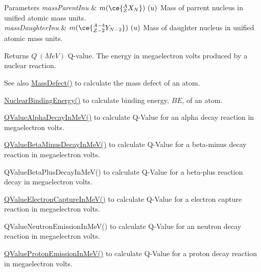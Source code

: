 \begin{DoxyParams}{Parameters}
{\em mass\+Parent\+Inu} & $m(\ce{ ^{A}_{Z}X_{N} })\ (u)$ Mass of parrent nucleus in unified atomic mass units. \\
\hline
{\em mass\+Daughter\+Inu} & $m(\ce{ ^{A-4}_{Z-2}Y_{N-2} })\ (u)$ Mass of daughter nucleus in unified atomic mass units. \\
\hline
\end{DoxyParams}
\begin{DoxyReturn}{Returns}
$Q\ (MeV)$ Q-\/value. The energy in megaelectron volts produced by a nuclear reaction. 
\end{DoxyReturn}
\begin{DoxySeeAlso}{See also}
\mbox{\hyperlink{group___e_g_x_phys-_mass_defect_gae89f2dfa65992c0314adc2440b2f582a}{Mass\+Defect()}} to calculate the mass defect of an atom. 

\mbox{\hyperlink{group___e_g_x_phys-_nuclear_binding_energy_gab6832bf15ead7b4e867e759e0a2a078e}{Nuclear\+Binding\+Energy()}} to calculate binding energy, $BE$, of an atom. 

\mbox{\hyperlink{group___e_g_x_phys-_q_value-_alpha_ga4f9a38d3ad4bf93471a0affb493b6e72}{Q\+Value\+Alpha\+Decay\+In\+Me\+V()}} to calculate Q-\/\+Value for an alpha decay reaction in megaelectron volts. 

\mbox{\hyperlink{group___e_g_x_phys-_q_value-_beta_minus_gaac1374ce9ba39bef416f34298708bda9}{Q\+Value\+Beta\+Minus\+Decay\+In\+Me\+V()}} to calculate Q-\/\+Value for a beta-\/minus decay reaction in megaelectron volts. 

Q\+Value\+Beta\+Plus\+Decay\+In\+Me\+V() to calculate Q-\/\+Value for a beta-\/plus reaction decay in megaelectron volts. 

\mbox{\hyperlink{group___e_g_x_phys-_q_value-_electron_capture_ga9cd8502b6101614c17114e9710cdcf6c}{Q\+Value\+Electron\+Capture\+In\+Me\+V()}} to calculate Q-\/\+Value for a electron capture reaction in megaelectron volts. 

Q\+Value\+Neutron\+Emission\+In\+Me\+V() to calculate Q-\/\+Value for an neutron decay reaction in megaelectron volts. 

\mbox{\hyperlink{group___e_g_x_phys-_q_value-_proton_ga5d92756e945e66bd2ed7d55145b95c3b}{Q\+Value\+Proton\+Emission\+In\+Me\+V()}} to calculate Q-\/\+Value for a proton decay reaction in megaelectron volts. 
\end{DoxySeeAlso}
\mbox{\label{group___e_g_x_phys-_q_value-_alpha_ga015ade04346d0c6dae4dda8e3aab8cbd}} 
